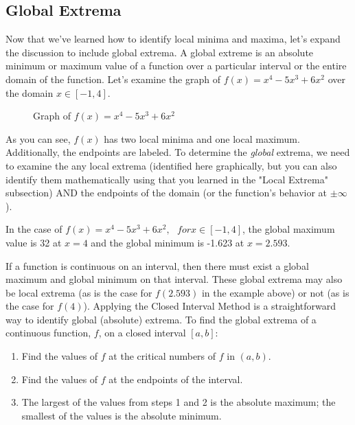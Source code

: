 \subsection{Global Extrema}
Now that we've learned how to identify local minima and maxima, let's expand the discussion to include global extrema. A global extreme is an absolute minimum or maximum value of a function over a particular interval or the entire domain of the function. Let's examine the graph of $f(x) = x^4-5x^3+6x^2$ over the domain $x \in [-1,4]$.

\begin{figure}[htbp]
  \centering
  \caption{Graph of \( f(x) = x^4-5x^3+6x^2 \) }
\end{figure}

As you can see, $f(x)$ has two local minima and one local maximum. Additionally, the endpoints are labeled. To determine the \textit{global} extrema, we need to examine the any local extrema (identified here graphically, but you can also identify them mathematically using that you learned in the "Local Extrema" subsection) AND the endpoints of the domain (or the function's behavior at $\pm \infty$). 

In the case of $f(x) = x^4-5x^3+6x^2,\text{ }for x\in [-1,4]$, the global maximum value is 32 at $x=4$ and the global minimum is -1.623 at $x=2.593$. 

If a function is continuous on an interval, then there must exist a global maximum and global minimum on that interval. These global extrema may also be local extrema (as is the case for $f(2.593)$ in the example above) or not (as is the case for $f(4)$). Applying the Closed Interval Method is a straightforward way to identify global (absolute) extrema. To find the global extrema of a continuous function, $f$, on a closed interval $[a, b]$:
\begin{enumerate}
\item Find the values of $f$ at the critical numbers of $f$ in $(a, b)$.
\item Find the values of $f$ at the endpoints of the interval.
\item The largest of the values from steps 1 and 2 is the absolute maximum; the smallest of the values is the absolute minimum.
\end{enumerate}


